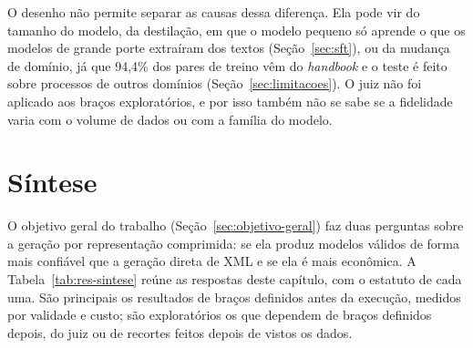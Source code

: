 

O desenho não permite separar as causas dessa diferença. Ela pode vir do tamanho do modelo, da destilação, em que o modelo pequeno só aprende o que os modelos de grande porte extraíram dos textos (Seção~\ref{sec:sft}), ou da mudança de domínio, já que 94,4\% dos pares de treino vêm do \textit{handbook} e o teste é feito sobre processos de outros domínios (Seção~\ref{sec:limitacoes}). O juiz não foi aplicado aos braços exploratórios, e por isso também não se sabe se a fidelidade varia com o volume de dados ou com a família do modelo.

\FloatBarrier
\section{Síntese}\label{sec:res-sintese}

O objetivo geral do trabalho (Seção~\ref{sec:objetivo-geral}) faz duas perguntas sobre a geração por representação comprimida: se ela produz modelos válidos de forma mais confiável que a geração direta de XML e se ela é mais econômica. A Tabela~\ref{tab:res-sintese} reúne as respostas deste capítulo, com o estatuto de cada uma. São principais os resultados de braços definidos antes da execução, medidos por validade e custo; são exploratórios os que dependem de braços definidos depois, do juiz ou de recortes feitos depois de vistos os dados.

